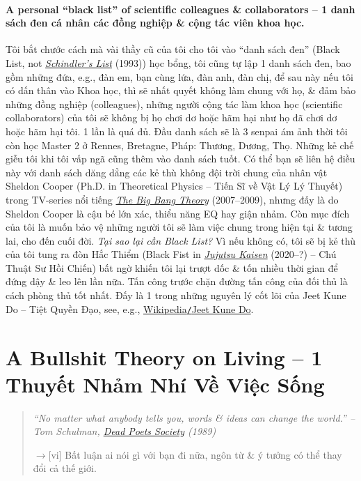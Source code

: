 \documentclass[12pt,twoside]{book}
\begin{document}
\subsubsection*{A personal ``black list'' of scientific colleagues \& collaborators -- 1 danh sách đen cá nhân các đồng nghiệp \& cộng tác viên khoa học.} Tôi bắt chước cách mà vài thầy cũ của tôi cho tôi vào ``danh sách đen'' (Black List, not \href{https://www.imdb.com/title/tt0108052/}{\it Schindler's List} (1993)) học bổng, tôi cũng tự lập 1 danh sách đen, bao gồm những đứa, e.g., đàn em, bạn cùng lứa, đàn anh, đàn chị, để sau này nếu tôi có dấn thân vào Khoa học, thì sẽ nhất quyết không làm chung với họ, \& đảm bảo những đồng nghiệp (colleagues), những người cộng tác làm khoa học (scientific collaborators) của tôi sẽ không bị họ chơi dơ hoặc hãm hại như họ đã chơi dơ hoặc hãm hại tôi. 1 lần là quá đủ. Đầu danh sách sẽ là 3 senpai ám ảnh thời tôi còn học Master 2 ở Rennes, Bretagne, Pháp: {\sf Thương, Dương, Thọ}. Những kẻ chế giễu tôi khi tôi vấp ngã cũng thêm vào danh sách tuốt. Có thể bạn sẽ liên hệ điều này với danh sách dăng dẳng các kẻ thù không đội trời chung của nhân vật {\sf Sheldon Cooper} (Ph.D. in Theoretical Physics -- Tiến Sĩ về Vật Lý Lý Thuyết) trong TV-series nổi tiếng \href{https://www.imdb.com/title/tt0898266}{\it The Big Bang Theory} (2007--2009), nhưng đấy là do {\sf Sheldon Cooper} là cậu bé lớn xác, thiểu năng EQ hay giận nhảm. Còn mục đích của tôi là muốn bảo vệ những người tôi sẽ làm việc chung trong hiện tại \& tương lai, cho đến cuối đời. {\it Tại sao lại cần Black List?} Vì nếu không có, tôi sẽ bị kẻ thù của tôi tung ra đòn Hắc Thiểm (Black Fist in \href{https://www.imdb.com/title/tt12343534/}{\it Jujutsu Kaisen} (2020--?) -- Chú Thuật Sư Hồi Chiến) bất ngờ khiến tôi lại trượt dốc \& tốn nhiều thời gian để đứng dậy \& leo lên lần nữa. Tấn công trước chặn đường tấn công của đối thủ là cách phòng thủ tốt nhất. Đấy là 1 trong những nguyên lý cốt lõi của {\sf Jeet Kune Do -- Tiệt Quyền Đạo}, see, e.g., \href{https://en.wikipedia.org/wiki/Jeet_Kune_Do}{Wikipedia{\tt/}Jeet Kune Do}.


\chapter{A Bullshit Theory on Living -- 1 Thuyết Nhảm Nhí Về Việc Sống}
\label{sect: bullshit theory on live}
\minitoc

\begin{quotation}\it
	``No matter what anybody tells you, words \& ideas can change the world.'' -- {\sc Tom Schulman}, \href{https://www.imdb.com/title/tt0097165}{Dead Poets Society} (1989)
	
	{\sf[en]$\to$[vi]} Bất luận ai nói gì với bạn đi nữa, ngôn từ \& ý tưởng có thể thay đổi cả thế giới.
\end{quotation}
\end{document}
